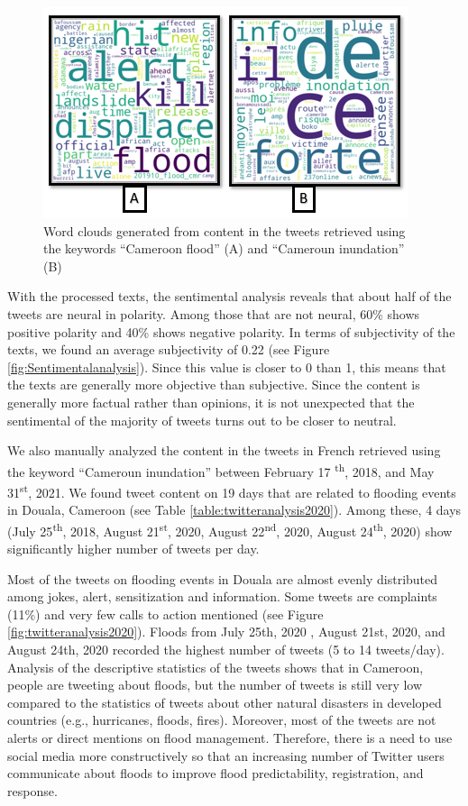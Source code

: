 \begin{figure}[htp]
	\centering
	\includegraphics[width=0.8\linewidth]{figure/Wordclouds.png}
	\caption{Word clouds generated from content in the tweets retrieved using the keywords “Cameroon flood” (A) and “Cameroun inundation” (B)}
	\label{fig:Wordclouds}
\end{figure}


With the processed texts, the sentimental analysis reveals that about half of the tweets are neural in polarity. Among those that are not neural, 60\% shows positive polarity and 40\% shows negative polarity. In terms of subjectivity of the texts, we found an average subjectivity of 0.22 (see Figure \ref{fig:Sentimentalanalysis}). Since this value is closer to 0 than 1, this means that the texts are generally more objective than subjective. Since the content is generally more factual rather than opinions, it is not unexpected that the sentimental of the majority of tweets turns out to be closer to neutral.

We also manually analyzed the content in the tweets in French retrieved using the keyword “Cameroun inundation” between February 17 \textsuperscript{th}, 2018, and May 31\textsuperscript{st}, 2021. We found tweet content on 19 days that are related to flooding events in Douala, Cameroon (see Table \ref{table:twitteranalysis2020}). Among these, 4 days (July 25\textsuperscript{th}, 2018, August 21\textsuperscript{st}, 2020, August 22\textsuperscript{nd}, 2020, August 24\textsuperscript{th}, 2020) show significantly higher number of tweets per day. 

Most of the tweets on flooding events in Douala are almost evenly distributed among jokes, alert, sensitization and information. Some tweets are complaints (11\%) and very few calls to action mentioned (see Figure \ref{fig:twitteranalysis2020}). Floods from July 25th, 2020 , August 21st, 2020, and August 24th, 2020 recorded the highest number of tweets (5 to 14 tweets/day).
Analysis of the descriptive statistics of the tweets shows that in Cameroon, people are tweeting about floods, but the number of tweets is still very low compared to the statistics of tweets about other natural disasters in developed countries (e.g., hurricanes, floods, fires). Moreover, most of the tweets are not alerts or direct mentions on flood management. Therefore, there is a need to use social media more constructively so that an increasing number of Twitter users communicate about floods to improve flood predictability, registration, and response.


